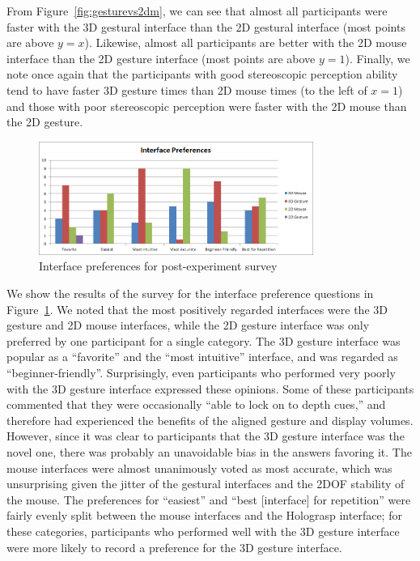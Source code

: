 \documentclass[pageno]{jpaper}
\begin{document}
From Figure~\ref{fig:gesturevs2dm}, we can see that almost all participants were
faster with the 3D gestural interface than the 2D gestural interface (most
points are above $y = x$). Likewise, almost all participants are better with the
2D mouse interface than the 2D gesture interface (most points are above $y=1$).
Finally, we note once again that the participants with good stereoscopic
perception ability tend to have faster 3D gesture times than 2D mouse times (to
the left of $x=1$) and those with poor stereoscopic perception were faster with
the 2D mouse than the 2D gesture.

\begin{figure}[h]
\centering
\includegraphics[width=0.8\textwidth]{figures/survey.png}
\caption{Interface preferences for post-experiment survey}
\label{fig:survey}
\end{figure}

We show the results of the survey for the interface preference questions in
Figure~\ref{fig:survey}. We noted that the most positively regarded interfaces were the 3D gesture and 2D mouse interfaces, while the
2D gesture interface was only preferred by one participant for a single category. The 3D gesture interface was popular as a ``favorite'' and the ``most intuitive''
interface, and was regarded as ``beginner-friendly''. Surprisingly, even participants who performed very poorly with the 3D gesture interface expressed these opinions.
Some of these participants commented that they were occasionally ``able to lock on to depth cues,'' and therefore had experienced the benefits of the aligned gesture
and display volumes. However, since it was clear to participants that the 3D gesture interface was the novel one, there was probably an unavoidable bias in the answers favoring it.
The mouse interfaces were almost unanimously voted as most accurate, which was unsurprising given the jitter of the gestural interfaces and the
2DOF stability of the mouse. The preferences for ``easiest'' and ``best [interface] for repetition'' were fairly evenly split between the mouse interfaces and the Holograsp
interface; for these categories, participants who performed well with the 3D gesture interface were more likely to record a preference for the 3D gesture interface.
\end{document}
